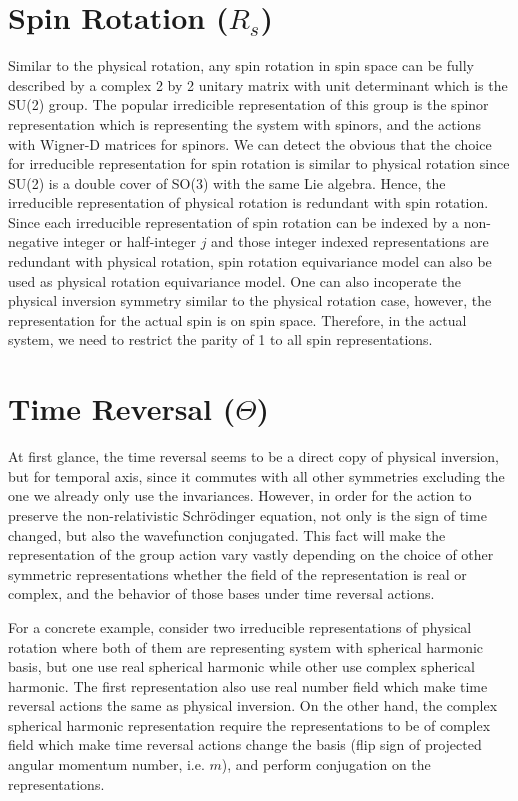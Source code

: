 \documentclass[reprint, 10pt]{revtex4-2}
\begin{document}
\section{Spin Rotation ($R_s$)}
Similar to the physical rotation, any spin rotation in spin space can be fully described by a complex 2 by 2 unitary matrix
with unit determinant which is the SU(2) group. The popular irredicible representation of this group is the spinor representation
which is representing the system with spinors, and the actions with Wigner-D matrices for spinors. We can detect the obvious
that the choice for irreducible representation for spin rotation is similar to physical rotation since SU(2) is a double cover
of SO(3) with the same Lie algebra. Hence, the irreducible representation of physical rotation is redundant with spin rotation.
Since each irreducible representation of spin rotation can be indexed by a non-negative integer or half-integer $j$
and those integer indexed representations are redundant with physical rotation, spin rotation equivariance model can
also be used as physical rotation equivariance model. One can also incoperate the physical inversion symmetry similar to the physical rotation case, 
however, the representation for the actual spin is on spin space. Therefore, in the actual system, we need to restrict
the parity of 1 to all spin representations.

\section{Time Reversal ($\Theta$)}
At first glance, the time reversal seems to be a direct copy of physical inversion, but for temporal axis, since it commutes
with all other symmetries excluding the one we already only use the invariances. However, in order for the action to preserve 
the non-relativistic Schr\"odinger equation, not only is the sign of time changed, but also the wavefunction conjugated. 
This fact will make the representation of the group action vary vastly depending on the choice of other symmetric 
representations whether the field of the representation is real or complex, and the behavior
of those bases under time reversal actions. 

For a concrete example, consider two irreducible representations of physical
rotation where both of them are representing system with spherical harmonic basis, but one use real spherical harmonic
while other use complex spherical harmonic. The first representation also use real number field which make time reversal
actions the same as physical inversion. On the other hand, the complex spherical harmonic representation require the 
representations to be of complex field which make time reversal actions change the basis (flip sign of projected angular 
momentum number, i.e. $m$), and perform conjugation on the representations. 
\end{document}
